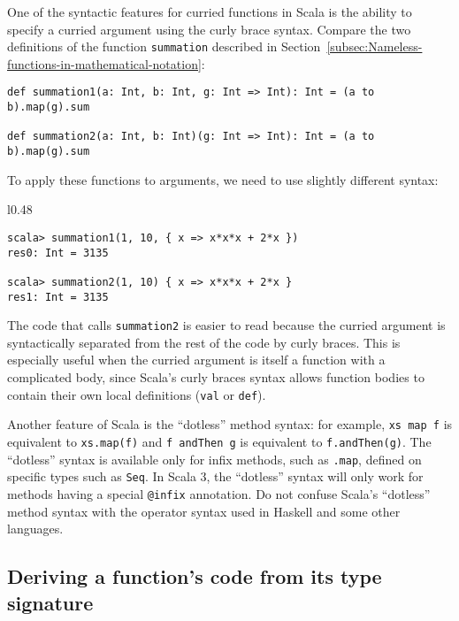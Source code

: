 One of the syntactic features for curried functions in Scala is the
ability to specify a curried argument using the curly brace syntax.
Compare the two definitions of the function \lstinline!summation!
described in Section~\ref{subsec:Nameless-functions-in-mathematical-notation}:
\begin{lstlisting}
def summation1(a: Int, b: Int, g: Int => Int): Int = (a to b).map(g).sum

def summation2(a: Int, b: Int)(g: Int => Int): Int = (a to b).map(g).sum
\end{lstlisting}
To apply these functions to arguments, we need to use slightly different
syntax:

\begin{wrapfigure}{l}{0.48\columnwidth}%
\vspace{-0.5\baselineskip}
\begin{lstlisting}
scala> summation1(1, 10, { x => x*x*x + 2*x })
res0: Int = 3135

scala> summation2(1, 10) { x => x*x*x + 2*x }
res1: Int = 3135
\end{lstlisting}
\vspace{-0.75\baselineskip}
\end{wrapfigure}%

\noindent The code that calls \lstinline!summation2! is easier to
read because the curried argument is syntactically separated from
the rest of the code by curly braces. This is especially useful when
the curried argument is itself a function with a complicated body,
since Scala's curly braces syntax allows function bodies to contain
their own local definitions (\lstinline!val! or \lstinline!def!).

Another feature of Scala is the ``dotless'' method syntax: for example,
\lstinline!xs map f! is equivalent to \lstinline!xs.map(f)! and
\lstinline!f andThen g! is equivalent to \lstinline!f.andThen(g)!.
The ``dotless'' syntax is available only for infix methods, such
as \lstinline!.map!, defined on specific types such as \lstinline!Seq!.
In Scala 3, the ``dotless'' syntax will only work for methods having
a special \lstinline!@infix! annotation. Do not confuse Scala's ``dotless''
method syntax with the operator syntax used in Haskell and some other
languages.

\subsection{Deriving a function's code from its type signature\label{subsec:Deriving-a-function's}}

